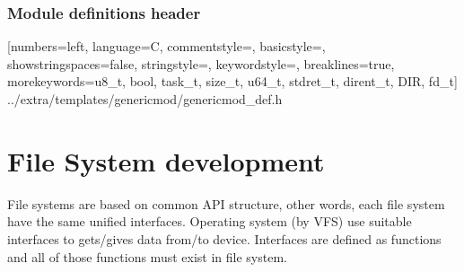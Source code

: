 \documentclass[a4paper,11pt]{report}
\newcommand{\includecode}[1]{
    [numbers=left, language=C, commentstyle=\color{commcolor}, basicstyle=\scriptsize\ttfamily,
    showstringspaces=false, stringstyle=\color{stringcolor}, keywordstyle=\color{keywordcolor},
    breaklines=true,
    morekeywords={u8_t, bool, task_t, size_t, u64_t, stdret_t, dirent_t, DIR, fd_t}]
    {#1}}
\begin{document}
\subsection{Module definitions header}
\includecode{../extra/templates/genericmod/genericmod_def.h}


\chapter{File System development}\label{sec:fs_devel}
File systems are based on common API structure, other words, each file system have the same unified
interfaces. Operating system (by VFS) use suitable interfaces to gets/gives data from/to device.
Interfaces are defined as functions and all of those functions must exist in file system.
\end{document}
